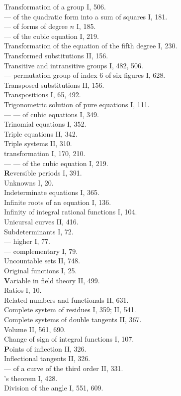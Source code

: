 \begin{flushleft}
Transformation of a group I, 506. \\
— of the quadratic form into a sum of squares I, 181. \\
— of forms of degree $n$ I, 185. \\
— of the cubic equation I, 219. \\
Transformation of the equation of the fifth degree I, 230. \\
Transformed substitutions II, 156. \\
Transitive and intransitive groups I, 482, 506. \\
— permutation group of index 6 of six figures I, 628. \\
Transposed substitutions II, 156. \\
Transpositions I, 65, 492. \\
Trigonometric solution of pure equations I, 111. \\
— — of cubic equations I, 349. \\
Trinomial equations I, 352. \\
Triple equations II, 342. \\
Triple systems II, 310. \\
 transformation I, 170, 210. \\
— — of the cubic equation I, 219. \\[6pt]
\textbf{R}eversible periods I, 391. \\
Unknowns I, 20. \\
Indeterminate equations I, 365. \\
Infinite roots of an equation I, 136. \\
Infinity of integral rational functions I, 104. \\
Unicursal curves II, 416. \\
Subdeterminants I, 72. \\
— higher I, 77. \\
— complementary I, 79. \\
Uncountable sets II, 748. \\
Original functions I, 25. \\[6pt]
\textbf{V}ariable in field theory II, 499. \\
Ratios I, 10. \\
Related numbers and functionals II, 631. \\
Complete system of residues I, 359; II, 541. \\
Complete systems of double tangents II, 367. \\
Volume II, 561, 690. \\
Change of sign of integral functions I, 107. \\[6pt]
\textbf{P}oints of inflection II, 326. \\
Inflectional tangents II, 326. \\
— of a curve of the third order II, 331. \\
's theorem I, 428. \\
Division of the angle I, 551, 609.
\end{flushleft}
